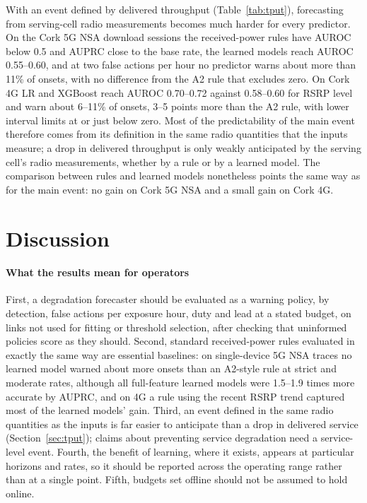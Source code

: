 \documentclass[preprint,review,12pt]{elsarticle}
\begin{document}
With an event defined by delivered throughput (Table~\ref{tab:tput}), forecasting from
serving-cell radio measurements becomes much harder for every predictor. On the Cork 5G
NSA download sessions the received-power rules have AUROC below 0.5 and AUPRC close to
the base rate, the learned models reach AUROC 0.55--0.60, and at two false actions per hour
no predictor warns about more than 11\% of onsets, with no difference from the A2 rule
that excludes zero. On Cork 4G LR and XGBoost reach AUROC 0.70--0.72 against 0.58--0.60
for RSRP level and warn about 6--11\% of onsets, 3--5 points more than the A2 rule, with
lower interval limits at or just below zero. Most of the predictability of the main
event therefore comes from its definition in the same radio quantities that the inputs
measure; a drop in delivered throughput is only weakly anticipated by the serving
cell's radio measurements, whether by a rule or by a learned model. The comparison
between rules and learned models nonetheless points the same way as for the main
event: no gain on Cork 5G NSA and a small gain on Cork 4G.

\section{Discussion}
\label{sec:discussion}

\paragraph{What the results mean for operators}
First, a degradation forecaster should be evaluated as a warning policy, by detection,
false actions per exposure hour, duty and lead at a stated budget, on links not used
for fitting or threshold selection, after checking that uninformed policies score as
they should. Second, standard received-power rules evaluated in exactly the same way
are essential baselines: on single-device 5G NSA traces no learned model warned about
more onsets than an A2-style rule at strict and moderate rates, although all full-feature
learned models were 1.5--1.9 times more accurate by AUPRC, and on 4G a rule using the
recent RSRP trend captured most of the learned models' gain. Third, an event defined in
the same radio quantities as the inputs is far easier to anticipate than a drop in
delivered service (Section~\ref{sec:tput}); claims about preventing service
degradation need a service-level event. Fourth, the benefit of learning, where it exists, appears at particular horizons
and rates, so it should be reported across the operating range rather than at a
single point. Fifth, budgets set offline should not be assumed to hold online.
\end{document}
